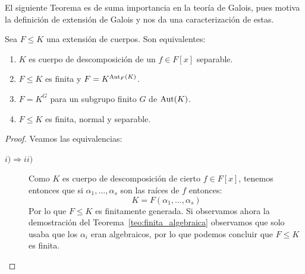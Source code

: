 El siguiente Teorema es de suma importancia en la teoría de Galois, pues motiva la definición de extensión de Galois y nos da una caracterización de estas.
\begin{teo}\label{teo:piedra_angular}
    Sea $F\leq K$ una extensión de cuerpos. Son equivalentes: 
    \begin{enumerate}[label=\roman*)]
        \item \label{item:teo_piedra_angular_i}
        $K$ es cuerpo de descomposición de un $f\in F[x]$ separable.
        \item \label{item:teo_piedra_angular_ii}
        $F\leq K$ es finita y $F = K^{\operatorname{Aut}_F(K)}$.
        \item $F = K^G$ para un subgrupo finito $G$ de $\operatorname{Aut}(K)$.
        \item $F\leq K$ es finita, normal y separable.
    \end{enumerate}
    \begin{proof}
        Veamos las equivalencias:
        \begin{description}
            \item [$i)\Longrightarrow  ii)$] Como $K$ es cuerpo de descomposición de cierto $f\in F[x]$, tenemos entonces que si $\alpha_1, \ldots, \alpha_s$ son las raíces de $f$ entonces:
                \begin{equation*}
                    K = F(\alpha_1, \ldots, \alpha_s)
                \end{equation*}
                Por lo que $F\leq K$ es finitamente generada. Si observamos ahora la demostración del Teorema~\ref{teo:finita_algebraica} observamos que solo usaba que los $\alpha_i$ eran algebraicos, por lo que podemos concluir que $F\leq K$ es finita.


\end{description}
\end{proof}
\end{teo}
